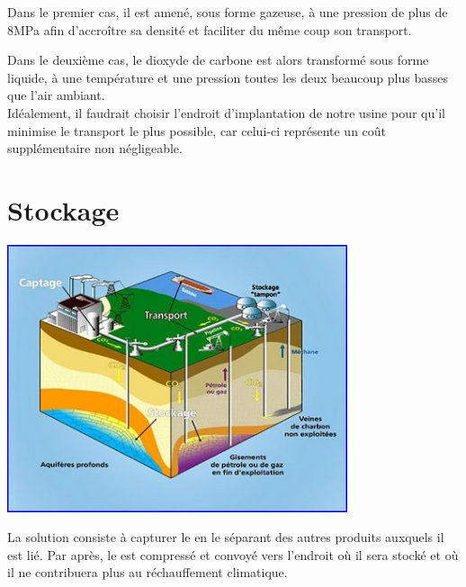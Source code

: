 \documentclass[10pt, a4, oneside, headings=normal]{scrartcl}
\begin{document}
Dans le premier cas, il est amené, sous forme gazeuse, à une pression de plus de 8MPa afin d'accroître sa densité et faciliter du même coup son transport. 

Dans le deuxième cas, le dioxyde de carbone est alors transformé sous forme liquide, à une température et une pression toutes les deux beaucoup plus basses que l'air ambiant.
\\

Idéalement, il faudrait choisir l'endroit d'implantation de notre usine pour qu'il minimise le transport le plus possible, car celui-ci représente un coût supplémentaire non négligeable.

\section{Stockage}

\begin{minipage}{0.5\textwidth}
\includegraphics[width=0.75\textwidth]{stockage.jpg}\cite{imstock}
\end{minipage}
\begin{minipage}{0.5\textwidth}
La solution consiste à capturer le  en le séparant des autres produits auxquels il est lié. Par après, le  est compressé et convoyé vers l'endroit où il sera stocké et où il ne contribuera plus au réchauffement climatique.
\end{minipage}
\\
\\
\end{document}
